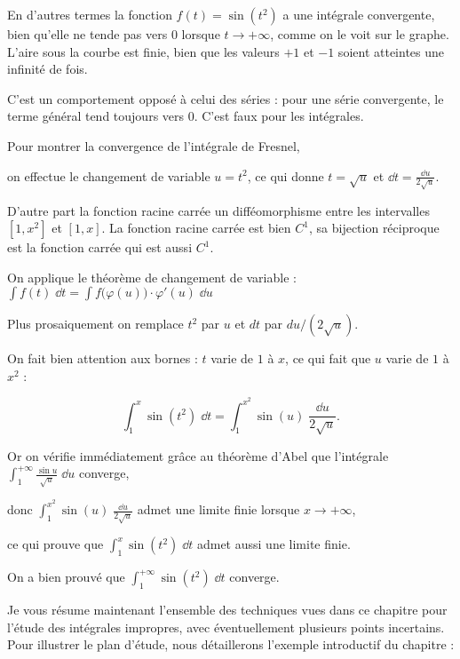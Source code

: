 En d'autres termes la fonction $f(t) = \sin(t^2)$ 
a une intégrale convergente, bien qu'elle ne tende pas vers 
$0$ lorsque $t\to+\infty$, comme on le voit sur le graphe.
L'aire sous la courbe est finie, bien que les valeurs $+1$ et $-1$ 
soient atteintes une infinité de fois.

C'est un comportement opposé à celui des séries : 
pour une série convergente, le terme général tend toujours vers $0$. C'est faux pour les intégrales.

\change 
Pour montrer la convergence de l'intégrale de Fresnel, 

\change
on effectue le changement de variable $u=t^2$, ce qui donne
$t=\sqrt{u}$ et  $\dd t=\frac{\dd u}{2\sqrt u}$. 

\change
D'autre part la fonction racine carrée un difféomorphisme entre 
les intervalles $[1,x^2]$ et $[1,x]$.
La fonction racine carrée est bien $C^1$, sa bijection réciproque 
est la fonction carrée qui est aussi $C^1$.


\change 
On applique le théorème de changement de variable :
$\int f(t) \;\dd t 
= \int f\big(\varphi(u)\big)\cdot\varphi'(u) \;\dd u$

\change
Plus prosaiquement on remplace $t^2$ par $u$
et $dt$ par $du/(2\sqrt u)$.

On fait bien attention aux bornes :
$t$ varie de $1$ à $x$, ce qui fait que $u$ varie de $1$ à $x^2$ :

$$\int_1^x \sin (t^2) \; \dd t = \int_1^{x^2} \sin (u) \; \frac{\dd u}{2\sqrt u}.$$

\change 
Or on vérifie immédiatement grâce au théorème d'Abel 
que l'intégrale $\int_1^{+\infty} \frac{\sin u}{\sqrt u} \; \dd u$
converge, 

\change 
donc  
$\int_1^{x^2} \sin (u) \; \frac{\dd u}{2\sqrt u}$ admet 
une limite finie lorsque $x\to+\infty$, 

\change
ce qui prouve que $\int_1^x \sin (t^2) \; \dd t$ 
admet aussi une limite finie. 

\change

On a bien prouvé que $\int_1^{+\infty} \sin (t^2) \; \dd t$ converge.

\diapo


Je vous résume maintenant l'ensemble des techniques vues dans ce chapitre
pour l'étude des intégrales impropres, avec éventuellement plusieurs points incertains. Pour
illustrer le plan d'étude, nous détaillerons l'exemple introductif du chapitre :

